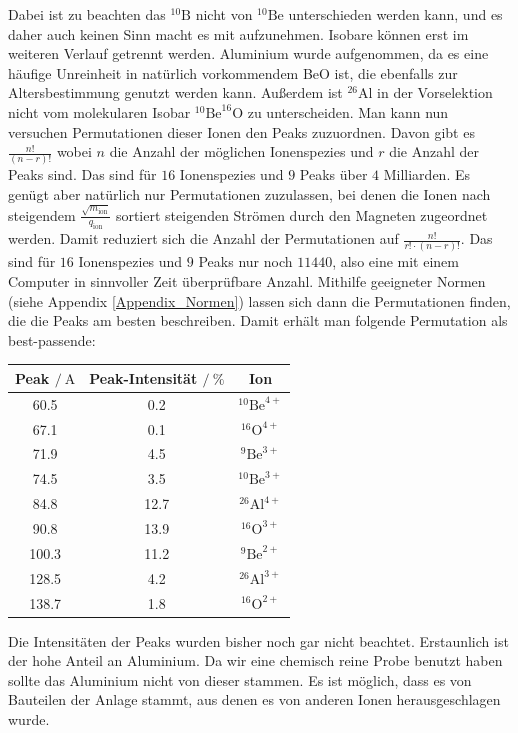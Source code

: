 Dabei ist zu beachten das $^{10}\text{B}$ nicht von $^{10}\text{Be}$ unterschieden werden kann, und es daher auch keinen Sinn macht es mit aufzunehmen.
Isobare können erst im weiteren Verlauf getrennt werden.
Aluminium wurde aufgenommen, da es eine häufige Unreinheit in natürlich vorkommendem BeO ist, die ebenfalls zur Altersbestimmung genutzt werden kann.
Außerdem ist $^{26}\text{Al}$ in der Vorselektion nicht vom molekularen Isobar $^{10}\text{Be}^{16}\text{O}$ zu unterscheiden.
Man kann nun versuchen Permutationen dieser Ionen den Peaks zuzuordnen.
Davon gibt es $\frac{n!}{(n-r)!}$ wobei $n$ die Anzahl der möglichen Ionenspezies und $r$ die Anzahl der Peaks sind.
Das sind für $16$ Ionenspezies und $9$ Peaks über $4$ Milliarden.
Es genügt aber natürlich nur Permutationen zuzulassen, bei denen die Ionen nach steigendem $\frac{\sqrt{m_{\text{ion}}}}{q_{\text{ion}}}$ sortiert steigenden Strömen durch den Magneten zugeordnet werden.
Damit reduziert sich die Anzahl der Permutationen auf $\frac{n!}{r! \cdot (n-r)!}$.
Das sind für $16$ Ionenspezies und $9$ Peaks nur noch $11440$, also eine mit einem Computer in sinnvoller Zeit überprüfbare Anzahl.
Mithilfe geeigneter Normen (siehe Appendix \ref{Appendix_Normen}) lassen sich dann die Permutationen finden, die die Peaks am besten beschreiben.
Damit erhält man folgende Permutation als best-passende:
\begin{center}
  \begin{tabular}{|c|c|c|}
    \hline
    Peak $/\ \si{\ampere}$ & Peak-Intensität $/\ \%$ & Ion \\
    \hline
    \num{60.5} & \num{0.2} & $^{10}\text{Be}^{4+}$ \\
    \hline
    \num{67.1} & \num{0.1} & $^{16}\text{O}^{4+}$ \\
    \hline
    \num{71.9} & \num{4.5} & $^{9}\text{Be}^{3+}$ \\
    \hline
    \num{74.5} & \num{3.5} & $^{10}\text{Be}^{3+}$ \\
    \hline
    \num{84.8} & \num{12.7} & $^{26}\text{Al}^{4+}$ \\
    \hline
    \num{90.8} & \num{13.9} & $^{16}\text{O}^{3+}$ \\
    \hline
    \num{100.3} & \num{11.2} & $^{9}\text{Be}^{2+}$ \\
    \hline
    \num{128.5} & \num{4.2} & $^{26}\text{Al}^{3+}$ \\
    \hline
    \num{138.7} & \num{1.8} & $^{16}\text{O}^{2+}$ \\
    \hline
  \end{tabular}
  \label{Auswertung_tab_Teilchenspezies_BeO_HE}
\end{center}
Die Intensitäten der Peaks wurden bisher noch gar nicht beachtet.
Erstaunlich ist der hohe Anteil an Aluminium.
Da wir eine chemisch reine Probe benutzt haben sollte das Aluminium nicht von dieser stammen.
Es ist möglich, dass es von Bauteilen der Anlage stammt, aus denen es von anderen Ionen herausgeschlagen wurde.

